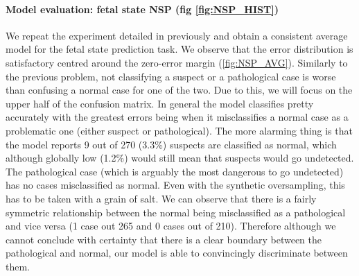 \documentclass[11pt,a4paper]{article}
\begin{document}
\paragraph{Model evaluation: fetal state NSP (fig \ref{fig:NSP_HIST})}
We repeat the experiment detailed in previously and obtain a consistent average model for the fetal state prediction task. We observe that the error distribution is satisfactory centred around the zero-error margin (\ref{fig:NSP_AVG}). Similarly to the previous problem, not classifying a suspect or a pathological case is worse than confusing a normal case for one of the two. Due to this, we will focus on the upper half of the confusion matrix. In general the model classifies pretty accurately with the greatest errors being when it misclassifies a normal case as a problematic one (either suspect or pathological). The more alarming thing is that the model reports 9 out of 270 (3.3\%)  suspects are classified as normal, which although globally low (1.2\%) would still mean that suspects would go undetected. The pathological case (which is arguably the most dangerous to go undetected) has no cases misclassified as normal. Even with the synthetic oversampling, this has to be taken with a grain of salt. We can observe that there is a fairly symmetric relationship between the normal being misclassified as a pathological and vice versa (1 case out 265 and 0 cases out of 210). Therefore although we cannot conclude with certainty that there is a clear boundary between the pathological and normal, our model is able to convincingly discriminate between them.
\end{document}
